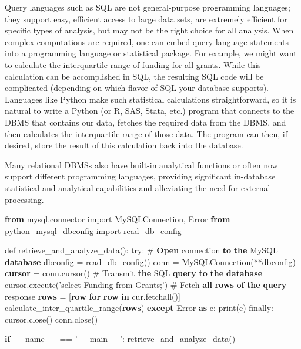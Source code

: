 \documentclass[]{krantz}
\newenvironment{Shaded}{\begin{snugshade}}{\end{snugshade}}
\newcommand{\KeywordTok}[1]{\textcolor[rgb]{0.13,0.29,0.53}{\textbf{#1}}}
\newcommand{\StringTok}[1]{\textcolor[rgb]{0.31,0.60,0.02}{#1}}
\newcommand{\NormalTok}[1]{#1}
\begin{document}
Query languages such as SQL are not general-purpose programming
languages; they support easy, efficient access to large data sets, are
extremely efficient for specific types of analysis, but may not be the
right choice for all analysis. When complex computations are required,
one can embed query language statements into a programming language or
statistical package. For example, we might want to calculate the
interquartile range of funding for all grants. While this calculation
can be accomplished in SQL, the resulting SQL code will be complicated
(depending on which flavor of SQL your database supports). Languages
like Python make such statistical calculations straightforward, so it is
natural to write a Python (or R, SAS, Stata, etc.) program that connects
to the DBMS that contains our data, fetches the required data from the
DBMS, and then calculates the interquartile range of those data. The
program can then, if desired, store the result of this calculation back
into the database.

Many relational DBMSs also have built-in analytical functions or often
now support different programming languages, providing significant
in-database statistical and analytical capabilities and alleviating the
need for external processing.

\begin{Shaded}
\begin{Highlighting}[]
\KeywordTok{from}\NormalTok{ mysql.connector import MySQLConnection, Error}
\KeywordTok{from}\NormalTok{ python_mysql_dbconfig import read_db_config}

\NormalTok{def retrieve_and_analyze_data():}
\NormalTok{    try:}
\NormalTok{        # }\KeywordTok{Open}\NormalTok{ connection }\KeywordTok{to} \KeywordTok{the}\NormalTok{ MySQL }\KeywordTok{database}
\NormalTok{        dbconfig = read_db_config()}
\NormalTok{        conn = MySQLConnection(**dbconfig)}
        \KeywordTok{cursor}\NormalTok{ = conn.cursor()}
\NormalTok{        # Transmit }\KeywordTok{the}\NormalTok{ SQL }\KeywordTok{query} \KeywordTok{to} \KeywordTok{the} \KeywordTok{database}
\NormalTok{        cursor.execute(}\StringTok{'select Funding from Grants;'}\NormalTok{)}
\NormalTok{        # Fetch }\KeywordTok{all} \KeywordTok{rows} \KeywordTok{of} \KeywordTok{the} \KeywordTok{query}\NormalTok{ response}
        \KeywordTok{rows}\NormalTok{ = [}\KeywordTok{row} \KeywordTok{for} \KeywordTok{row} \KeywordTok{in}\NormalTok{ cur.fetchall()]}
\NormalTok{        calculate_inter_quartile_range(}\KeywordTok{rows}\NormalTok{)}
    \KeywordTok{except}\NormalTok{ Error }\KeywordTok{as}\NormalTok{ e:}
\NormalTok{        print(e)}
\NormalTok{    finally:}
\NormalTok{        cursor.close()}
\NormalTok{        conn.close()}

\KeywordTok{if}\NormalTok{ __name__ == }\StringTok{'__main__'}\NormalTok{:}
\NormalTok{    retrieve_and_analyze_data()}
\end{Highlighting}
\end{Shaded}
\end{document}
